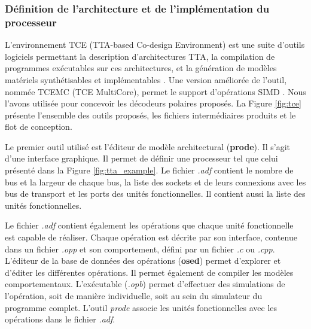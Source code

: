 \subsubsection{Définition de l'architecture et de l'implémentation du processeur}

L'environnement TCE (TTA-based Co-design Environment) est une suite d'outils logiciels permettant la description d'architectures TTA, la compilation de programmes exécutables sur ces architectures, et la génération de modèles matériels synthétisables et implémentables \cite{jaaskelainen_hw/sw_2017}. Une version améliorée de l'outil, nommée TCEMC (TCE MultiCore), permet le support d'opérations SIMD \cite{tcemc_2011}. Nous l'avons utilisée pour concevoir les décodeurs polaires proposés. La Figure \ref{fig:tce} présente l'ensemble des outils proposés, les fichiers intermédiaires produits et le flot de conception.

Le premier outil utilisé est l'éditeur de modèle architectural (\textbf{prode}). Il s'agit d'une interface graphique. Il permet de définir une processeur tel que celui présenté dans la Figure \ref{fig:tta_example}. Le fichier \textit{.adf} contient le nombre de bus et la largeur de chaque bus, la liste des sockets et de leurs connexions avec les bus de transport et les ports des unités fonctionnelles. Il contient aussi la liste des unités fonctionnelles.

Le fichier \textit{.adf} contient également les opérations que chaque unité fonctionnelle est capable de réaliser. Chaque opération est décrite par son interface, contenue dans un fichier \textit{.opp} et son comportement, défini par un fichier \textit{.c} ou \textit{.cpp}. L'éditeur de la base de données des opérations (\textbf{osed}) permet d'explorer et d'éditer les différentes opérations. Il permet également de compiler les modèles comportementaux. L'exécutable (\textit{.opb}) permet d'effectuer des simulations de l'opération, soit de manière individuelle, soit au sein du simulateur du programme complet. L'outil \textit{prode} associe les unités fonctionnelles avec les opérations dans le fichier \textit{.adf}.

